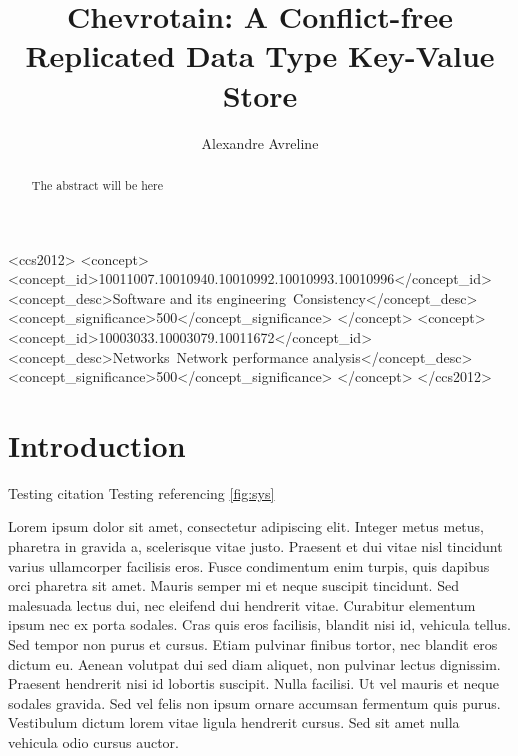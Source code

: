\documentclass[sigconf,nonacm,11pt]{acmart}
\begin{document}
\title{Chevrotain: A Conflict-free Replicated Data Type Key-Value Store}

\author{Alexandre Avreline}

\begin{abstract}
The abstract will be here
\end{abstract}

\begin{CCSXML}
<ccs2012>
   <concept>
       <concept_id>10011007.10010940.10010992.10010993.10010996</concept_id>
       <concept_desc>Software and its engineering~Consistency</concept_desc>
       <concept_significance>500</concept_significance>
       </concept>
   <concept>
       <concept_id>10003033.10003079.10011672</concept_id>
       <concept_desc>Networks~Network performance analysis</concept_desc>
       <concept_significance>500</concept_significance>
       </concept>
 </ccs2012>
\end{CCSXML}




\maketitle

\section{Introduction}
Testing citation \cite{Davey:Lattices}
Testing referencing \ref{fig:sys}

Lorem ipsum dolor sit amet, consectetur adipiscing elit. Integer metus metus, pharetra in gravida a, scelerisque vitae justo. Praesent et dui vitae nisl tincidunt varius ullamcorper facilisis eros. Fusce condimentum enim turpis, quis dapibus orci pharetra sit amet. Mauris semper mi et neque suscipit tincidunt. Sed malesuada lectus dui, nec eleifend dui hendrerit vitae. Curabitur elementum ipsum nec ex porta sodales. Cras quis eros facilisis, blandit nisi id, vehicula tellus. Sed tempor non purus et cursus. Etiam pulvinar finibus tortor, nec blandit eros dictum eu. Aenean volutpat dui sed diam aliquet, non pulvinar lectus dignissim. Praesent hendrerit nisi id lobortis suscipit. Nulla facilisi. Ut vel mauris et neque sodales gravida. Sed vel felis non ipsum ornare accumsan fermentum quis purus. Vestibulum dictum lorem vitae ligula hendrerit cursus. Sed sit amet nulla vehicula odio cursus auctor.
\end{document}
